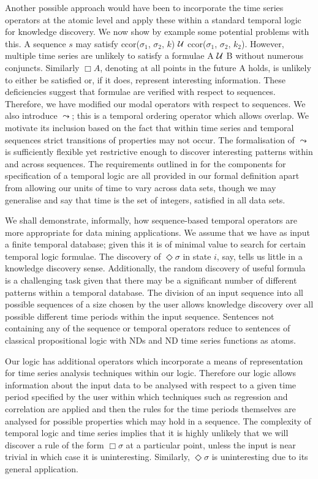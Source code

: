 Another possible approach would have been to incorporate the time
series operators at the atomic level and apply these within a standard
temporal logic for knowledge discovery. We now show by example some
potential problems with this. A sequence $s$ may satisfy
ccor($\sigma_1$, $\sigma_2$, $k$) ${\cal U}$ ccor($\sigma_1$,
$\sigma_2$, $k_2$). However, multiple time series are unlikely to
satisfy a formulae A ${\cal U}$ B without numerous conjuncts. Similarly
$\Box A$, denoting at all points in the future A holds, is unlikely to
either be satisfied or, if it does, represent interesting information. These
deficiencies suggest that formulae are verified with respect to
sequences. Therefore, we have modified our modal operators with
respect to sequences. We also introduce $\leadsto$; this is a temporal
ordering operator which allows overlap. We motivate its inclusion
based on the fact that within time series and temporal sequences
strict transitions of properties may not occur. The formalisation of
$\leadsto$ is sufficiently flexible yet restrictive enough to discover
interesting patterns within and across sequences. The requirements
outlined in \cite{ghr94} for the components for specification of a
temporal logic are all provided in our formal definition apart from
allowing our units of time to vary across data sets, though we may
generalise and say that time is the set of integers, satisfied in all
data sets.

\smallskip

We shall demonstrate, informally, how sequence-based temporal operators
are more appropriate for data mining applications. We assume that we
have as input a finite temporal database; given this it is of minimal
value to search for certain temporal logic formulae. The discovery of
$\Diamond \sigma$ in state $i$, say, tells us little in a knowledge
discovery sense.  Additionally, the random discovery of useful formula
is a challenging task given that there may be a significant number of
different patterns within a temporal database. The division of an
input sequence into all possible sequences of a size chosen by the
user allows knowledge discovery over all possible different time
periods within the input sequence. Sentences not containing any of the
sequence or temporal operators reduce to sentences of classical
propositional logic with NDs and ND time series functions as atoms.

\medskip

Our logic has additional operators which incorporate a means of
representation for time series analysis techniques within our
logic. Therefore our logic allows information about the input data to
be analysed with respect to a given time period specified by the user
within which techniques such as regression and correlation are applied
and then the rules for the time periods themselves are analysed for
possible properties which may hold in a sequence. The complexity of
temporal logic and time series implies that it is highly unlikely that
we will discover a rule of the form $\Box \sigma$ at a particular
point, unless the input is near trivial in which case it is
uninteresting. Similarly, $\Diamond \sigma$ is uninteresting due to
its general application.


